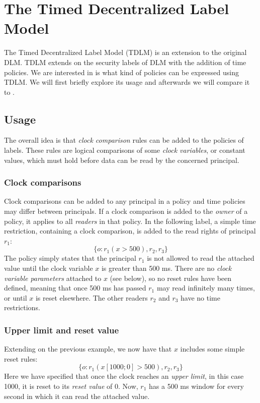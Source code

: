 
\newcommand{\tat}{\;@\;} %
\newcommand{\tdor}{\;||\;} %
\newcommand{\tdand}{\;\&\&\;} %

\section{The Timed Decentralized Label Model}
The Timed Decentralized Label Model (TDLM) \cite{pedersen2015} is an extension to the original DLM.
TDLM extends on the security labels of DLM with the addition of time policies.
We are interested in is what kind of policies can be expressed using TDLM.
We will first briefly explore its usage and afterwards we will compare it to \thelang.

\subsection{Usage}
The overall idea is that \emph{clock comparison} rules can be added to the policies of labels.
These rules are logical comparisons of some \emph{clock variables}, or constant values, which must hold before data can be read by the concerned principal.

\subsubsection{Clock comparisons}
Clock comparisons can be added to any principal in a policy and time policies may differ between principals.
If a clock comparison is added to the \emph{owner} of a policy, it applies to all \emph{readers} in that policy.
In the following label, a simple time restriction, containing a clock comparison, is added to the read rights of principal $r_1$:
  \[ \{ o : r_1(x > 500), r_2, r_3 \} \]
The policy simply states that the principal $r_1$ is not allowed to read the attached value until the clock variable $x$ is greater than 500 ms.
There are no \emph{clock variable parameters} attached to $x$ (see below), so no reset rules have been defined, meaning that once 500 ms has passed $r_1$ may read infinitely many times, or until $x$ is reset elsewhere.
The other readers $r_2$ and $r_3$ have no time restrictions.

\subsubsection{Upper limit and reset value}
Extending on the previous example, we now have that $x$ includes some simple reset rules:
  \[ \{ o : r_1(x[1000;0] > 500), r_2, r_3 \} \]
Here we have specified that once the clock reaches an \emph{upper limit}, in this case 1000, it is reset to its \emph{reset value} of 0.
Now, $r_1$ has a 500 ms window for every second in which it can read the attached value.

